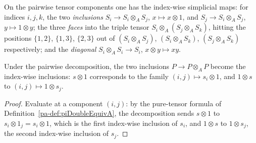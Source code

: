 \begin{definition}
  \label{pa-def:indexwiseMaps}
  \leanok

  On the pairwise tensor components one has the index-wise simplicial maps: for indices
  \(i, j, k\), the two \emph{inclusions} \(S_i \to S_i \otimes_A S_j\), \(x \mapsto x \otimes 1\),
  and \(S_j \to S_i \otimes_A S_j\), \(y \mapsto 1 \otimes y\); the three \emph{faces} into the
  triple tensor \(S_i \otimes_A (S_j \otimes_A S_k)\), hitting the positions \(\{1,2\}\),
  \(\{1,3\}\), \(\{2,3\}\) out of \((S_i \otimes_A S_j)\), \((S_i \otimes_A S_k)\),
  \((S_j \otimes_A S_k)\) respectively; and the \emph{diagonal}
  \(S_i \otimes_A S_i \to S_i\), \(x \otimes y \mapsto xy\).
\end{definition}

\begin{lemma}
  \label{pa-lem:descentIncl_transport}
  \leanok

  Under the pairwise decomposition, the two inclusions \(P \to P \otimes_A P\) become the
  index-wise inclusions: \(s \otimes 1\) corresponds to the family
  \((i,j) \mapsto s_i \otimes 1\), and \(1 \otimes s\) to \((i,j) \mapsto 1 \otimes s_j\).
\end{lemma}
\begin{proof}
  \leanok
  Evaluate at a component \((i,j)\): by the pure-tensor formula of
  Definition~\ref{pa-def:piDoubleEquivA}, the decomposition sends \(s \otimes 1\) to
  \(s_i \otimes 1_j = s_i \otimes 1\), which is the first index-wise inclusion of \(s_i\), and
  \(1 \otimes s\) to \(1 \otimes s_j\), the second index-wise inclusion of \(s_j\).
\end{proof}

